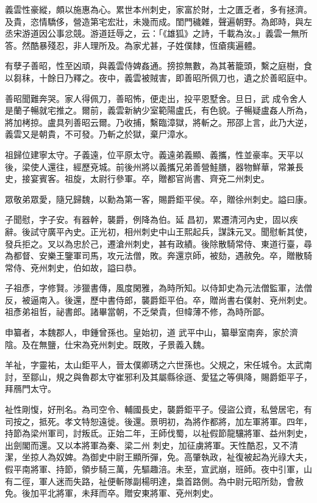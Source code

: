 \begin{pinyinscope}
 義雲性豪縱，頗以施惠為心。累世本州刺史，家富於財，士之匱乏者，多有拯濟。及貴，恣情驕侈，營造第宅宏壯，未幾而成。閨門穢雜，聲遍朝野。為郎時，與左丞宋游道因公事忿競。游道廷辱之，云：「《雄狐》之詩，千載為汝。」義雲一無所答。然酷暴殘忍，非人理所及。為家尤甚，子姓僕隸，恆瘡痍遍體。



 有孽子善昭，性至凶頑，與義雲侍婢姦通。搒掠無數，為其著籠頭，繫之庭樹，食以芻秣，十餘日乃釋之。夜中，義雲被賊害，即善昭所佩刀也，遺之於善昭庭中。



 善昭聞難奔哭。家人得佩刀，善昭怖，便走出，投平恩墅舍。旦日，武
 成令舍人是蘭子暢就宅推之。爾前，義雲新納少室範陽盧氏，有色貌。子暢疑盧姦人所為，將加栲掠。盧具列善昭云爾。乃收捕，繫臨漳獄，將斬之。邢邵上言，此乃大逆，義雲又是朝貴，不可發。乃斬之於獄，棄尸漳水。



 祖歸位建寧太守。子義遠，位平原太守。義遠弟義顯、義攜，性並豪率。天平以後，梁使人還往，經歷兗城。前後州將以義攜兄弟善營鮭膳，器物鮮華，常兼長史，接宴賓客。祖旋，太尉行參軍。卒，贈都官尚書、齊兗二州刺史。



 眾敬弟眾愛，隨兄歸魏，以勳為第一客，賜爵鉅平侯。卒，贈徐州刺史。謚曰康。



 子聞慰，字子安。有器幹，襲爵，例降為伯。延
 昌初，累遷清河內史，固以疾辭。後試守廣平內史。正光初，相州刺史中山王熙起兵，謀誅元叉。聞慰斬其使，發兵拒之。叉以為忠於己，遷滄州刺史，甚有政績。後除散騎常侍、東道行臺，尋為都督、安樂王鑒軍司馬，攻元法僧，敗。奔還京師，被劾，遇赦免。卒，贈散騎常侍、兗州刺史，伯如故，謚曰恭。



 子祖彥，字修賢。涉獵書傳，風度閑雅，為時所知。以侍卸史為元法僧監軍，法僧反，被逼南入。後還，歷中書侍郎，襲爵鉅平伯。卒，贈尚書右僕射、兗州刺史。祖彥弟祖哲，祕書郎。諸畢當朝，不乏榮貴，但幃薄不修，為時所鄙。



 申纂者，本魏郡人，申鍾曾孫也。皇始初，道
 武平中山，纂舉室南奔，家於濟陰。及在無鹽，仕宋為兗州刺史。既敗，子景義入魏。



 羊祉，字靈祐，太山鉅平人，晉太僕卿琇之六世孫也。父規之，宋任城令。太武南討，至鄒山，規之與魯郡太守崔邪利及其屬縣徐遜、愛猛之等俱降，賜爵鉅平子，拜鴈門太守。



 祉性剛愎，好刑名。為司空令、輔國長史，襲爵鉅平子。侵盜公資，私營居宅，有司按之，抵死。孝文特恕遠徙。後還。景明初，為將作都將，加左軍將軍。四年，持節為梁州軍司，討叛氐。正始二年，王師伐蜀，以祉假節龍驤將軍、益州刺史，出劍閣而還。又以本將軍為秦、梁二州
 刺史，加征虜將軍。天性酷忍，又不清潔，坐掠人為奴婢。為御史中尉王顯所彈，免。高肇執政，祉復被起為光祿大夫，假平南將軍、持節，領步騎三萬，先驅趣涪。未至，宣武崩，班師。夜中引軍，山有二徑，軍人迷而失路，祉便斬隊副楊明達，梟首路側。為中尉元昭所劾，會赦免。後加平北將軍，未拜而卒。贈安東將軍、兗州刺史。




\end{pinyinscope}
